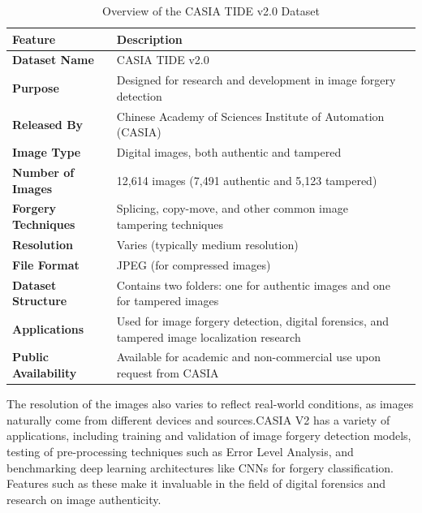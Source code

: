 \documentclass{ieeeaccess}
\begin{document}
	\begin{table}[h!]
		\centering
		\setlength{\tabcolsep}{3pt}
		\vspace{3mm}
		\begin{tabular}{|p{75pt}|p{150pt}|p{115pt}|}
			\hline
			\textbf{Feature}            & \textbf{Description}                                                                 \\ \hline
			\textbf{Dataset Name}       & CASIA TIDE v2.0                                                                      \\ \hline
			\textbf{Purpose}            & Designed for research and development in image forgery detection                     \\ \hline
			\textbf{Released By}        & Chinese Academy of Sciences Institute of Automation (CASIA)                          \\ \hline
			\textbf{Image Type}         & Digital images, both authentic and tampered                                          \\ \hline
			\textbf{Number of Images}   & 12,614 images (7,491 authentic and 5,123 tampered)                                   \\ \hline
			\textbf{Forgery Techniques} & Splicing, copy-move, and other common image tampering techniques                      \\ \hline
			\textbf{Resolution}         & Varies (typically medium resolution)                                                 \\ \hline
			\textbf{File Format}        & JPEG (for compressed images)                                                         \\ \hline
			\textbf{Dataset Structure}  & Contains two folders: one for authentic images and one for tampered images           \\ \hline
			\textbf{Applications}       & Used for image forgery detection, digital forensics, and tampered image localization research \\ \hline
			\textbf{Public Availability} & Available for academic and non-commercial use upon request from CASIA               \\ \hline
		\end{tabular}
		\caption{Overview of the CASIA TIDE v2.0 Dataset}
		\label{casiav2overview}
	\end{table}
	
	
	The resolution of the images also varies to reflect real-world conditions, as images naturally come from different devices and sources.CASIA V2 has a variety of applications, including training and validation of image forgery detection models, testing of pre-processing techniques such as Error Level Analysis, and benchmarking deep learning architectures like CNNs for forgery classification. Features such as these make it invaluable in the field of digital forensics and research on image authenticity.
	
\end{document}
